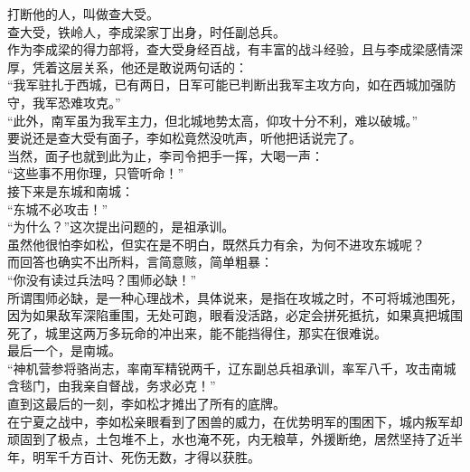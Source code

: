 \begin{multicols}{\theparacolNo}
打断他的人，叫做查大受。\\

查大受，铁岭人，李成梁家丁出身，时任副总兵。\\

作为李成梁的得力部将，查大受身经百战，有丰富的战斗经验，且与李成梁感情深厚，凭着这层关系，他还是敢说两句话的：\\

“我军驻扎于西城，已有两日，日军可能已判断出我军主攻方向，如在西城加强防守，我军恐难攻克。”\\

“此外，南军虽为我军主力，但北城地势太高，仰攻十分不利，难以破城。”\\

要说还是查大受有面子，李如松竟然没吭声，听他把话说完了。\\

当然，面子也就到此为止，李司令把手一挥，大喝一声：\\

“这些事不用你理，只管听命！”\\

接下来是东城和南城：\\

“东城不必攻击！”\\

“为什么？”这次提出问题的，是祖承训。\\

虽然他很怕李如松，但实在是不明白，既然兵力有余，为何不进攻东城呢？\\

而回答也确实不出所料，言简意赅，简单粗暴：\\

“你没有读过兵法吗？围师必缺！”\\

所谓围师必缺，是一种心理战术，具体说来，是指在攻城之时，不可将城池围死，因为如果敌军深陷重围，无处可跑，眼看没活路，必定会拼死抵抗，如果真把城围死了，城里这两万多玩命的冲出来，能不能挡得住，那实在很难说。\\

最后一个，是南城。\\

“神机营参将骆尚志，率南军精锐两千，辽东副总兵祖承训，率军八千，攻击南城含毯门，由我亲自督战，务求必克！”\\

直到这最后的一刻，李如松才摊出了所有的底牌。\\

在宁夏之战中，李如松亲眼看到了困兽的威力，在优势明军的围困下，城内叛军却顽固到了极点，土包堆不上，水也淹不死，内无粮草，外援断绝，居然坚持了近半年，明军千方百计、死伤无数，才得以获胜。\\


\end{multicols}
